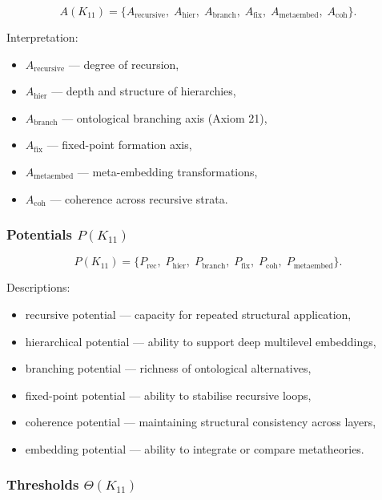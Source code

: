 \[
A(K_{11}) =
\{
A_{\mathrm{recursive}},\;
A_{\mathrm{hier}},\;
A_{\mathrm{branch}},\;
A_{\mathrm{fix}},\;
A_{\mathrm{metaembed}},\;
A_{\mathrm{coh}}
\}.
\]

Interpretation:
\begin{itemize}
    \item $A_{\mathrm{recursive}}$ — degree of recursion,
    \item $A_{\mathrm{hier}}$ — depth and structure of hierarchies,
    \item $A_{\mathrm{branch}}$ — ontological branching axis (Axiom 21),
    \item $A_{\mathrm{fix}}$ — fixed-point formation axis,
    \item $A_{\mathrm{metaembed}}$ — meta-embedding transformations,
    \item $A_{\mathrm{coh}}$ — coherence across recursive strata.
\end{itemize}

\subsubsection{Potentials $P(K_{11})$}

\[
P(K_{11})=
\{
P_{\mathrm{rec}},\;
P_{\mathrm{hier}},\;
P_{\mathrm{branch}},\;
P_{\mathrm{fix}},\;
P_{\mathrm{coh}},\;
P_{\mathrm{metaembed}}
\}.
\]

Descriptions:
\begin{itemize}
    \item recursive potential — capacity for repeated structural application,
    \item hierarchical potential — ability to support deep multilevel embeddings,
    \item branching potential — richness of ontological alternatives,
    \item fixed-point potential — ability to stabilise recursive loops,
    \item coherence potential — maintaining structural consistency across layers,
    \item embedding potential — ability to integrate or compare metatheories.
\end{itemize}

\subsubsection{Thresholds $\Theta(K_{11})$}

